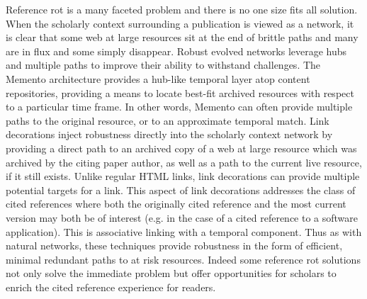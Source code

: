 \documentclass[12pt]{article}
\begin{document}
Reference rot is a many faceted problem and there is no one size fits all solution. When the scholarly context surrounding a publication is viewed as a network, it is clear that some web at large resources sit at the end of brittle paths and many are in flux and some simply disappear. Robust evolved networks leverage hubs and multiple paths to improve their ability to withstand challenges. The Memento architecture provides a hub-like temporal layer atop content repositories, providing a means to locate best-fit archived resources with respect to a particular time frame. In other words, Memento can often provide multiple paths to the original resource, or to an approximate temporal match. Link decorations inject robustness directly into the scholarly context network by providing a direct path to an archived copy of a web at large resource which was archived by the citing paper author, as well as a path to the current live resource, if it still exists. Unlike regular HTML links, link decorations can provide multiple potential targets for a link. This aspect of link decorations addresses the class of cited references where both the originally cited reference and the most current version may both be of interest (e.g. in the case of a cited reference to a software application). This is associative linking with a temporal component. Thus as with natural networks, these techniques provide robustness in the form of efficient, minimal redundant paths to at risk resources. Indeed some reference rot solutions not only solve the immediate  problem but offer opportunities for scholars to enrich the cited reference experience for readers.
\end{document}
